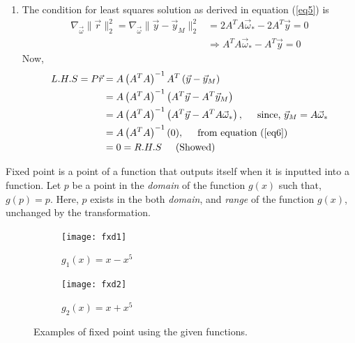 \documentclass[11pt]{article} %
\begin{document}
\begin{enumerate}
\begin{enumerate}[\textbf{(\alph*)}]
\item The condition for least squares solution as derived in equation (\ref{eq5}) is
\begin{equation}
\begin{split}
\nabla_{\Vec{\omega}}\|\Vec r\|_2^2 = \nabla_{\Vec{\omega}}\|\Vec y - \Vec y_M\|_2^2 &= 2A^TA\Vec \omega_* - 2A^T\Vec y = 0 \\
&\Rightarrow A^TA\Vec \omega_* - A^T\Vec y = 0
\end{split}
\label{eq6}
\end{equation}
Now, 
\begin{equation*}
\begin{split}
L.H.S = P\vec r &= A\left(A^TA\right)^{-1}A^T\left(\Vec y - \Vec y_M\right) \\
&= A\left(A^TA\right)^{-1}\left(A^T\Vec y - A^T\Vec y_M\right)\\
&= A\left(A^TA\right)^{-1}\left(A^T\Vec y - A^TA\Vec\omega_*\right), \hspace{0.5cm} \text{since, $\Vec y_M = A\Vec\omega_*$}\\
&= A\left(A^TA\right)^{-1} (0), \hspace{0.5cm} \text{from equation (\ref{eq6})}\\
&= 0 =R.H.S \hspace{0.5cm} \text{(Showed)}
\end{split}
\end{equation*}
\end{enumerate}
\end{enumerate}
\iffalse
Fixed point is a point of a function that outputs itself when it is inputted into a function. Let $p$ be a point in the \textit{domain} of the function $g(x)$ such that, $g(p) = p$. Here, $p$ exists in the both \textit{domain}, and \textit{range} of the function $g(x)$, unchanged by the transformation.
\begin{figure}[!htb]
    \centering
    \begin{subfigure}{.5\textwidth}
        \centering
        \texttt{[image: fxd1]}
        \caption{$g_1(x) = x - x^5$}
        \label{fig1a}
    \end{subfigure}\hfill
    \begin{subfigure}{0.5\textwidth}
        \centering
        \texttt{[image: fxd2]}
        \caption{$g_2(x) = x + x^5$}
        \label{fig1b}
    \end{subfigure}
    \caption{Examples of fixed point using the given functions.}
    \label{fig1}
\end{figure}
\end{document}
